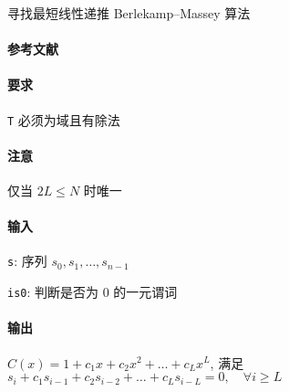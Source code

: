 寻找最短线性递推 Berlekamp--Massey 算法

\paragraph{参考文献} \cite{massey1969shift}

\paragraph{要求} \verb|T| 必须为域且有除法

\paragraph{注意} 仅当 \(2L \leq N\) 时唯一

\paragraph{输入}

\verb|s|: 序列 \(s_0, s_1, \dots, s_{n-1}\)

\verb|is0|: 判断是否为 \(0\) 的一元谓词

\paragraph{输出}

\(C(x)=1+c_{1}x+c_{2}x^{2}+\dots+c_{L}x^{L}\), 满足 \(s_{i} + c_{1}s_{i-1} + c_{2}s_{i-2} + \dots + c_{L}s_{i-L} = 0,\quad\forall i\geq L\)
